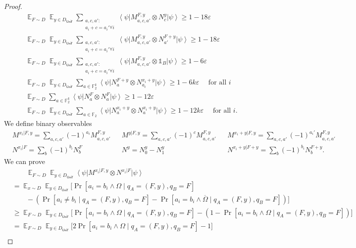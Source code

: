 \documentclass[10pt,a4paper]{article}
\theoremstyle{plain}
\theoremstyle{definition}
\newcommand {\bra} [1] {\ensuremath{ \left\langle #1 \right| }}
\newcommand {\ket} [1] {\ensuremath{ \left| #1 \right\rangle }}
\DeclareMathOperator*{\bigE}{\mathbb{E}}
\newcommand {\id} {\ensuremath{\mathds{1}}}
\newcommand{\ep} {\ensuremath{\varepsilon}}
\newcommand{\x}{\otimes}
\newcommand{\1}{\mathbb{1}} %
\newcommand{\bF}{\mathbb{F}}
\newcommand{\Unif}{\mathsf{Unif}}
\begin{document}
\begin{proof}
\begin{align*}
	&\bigE_{F \sim D} \bigE_{y \in D_{\Unif}}  \sum_{\substack{a,c,a': \\ a_i + c = a_i' \forall i}} \bra{\psi} M^{F,y}_{a, c, a'} \x N^y_c \ket{\psi }\geq 1 - 18 \ep \\
	&\bigE_{F \sim D} \bigE_{y \in D_{\Unif}} \sum_{\substack{a,c,a': \\ a_i + c = a_i' \forall i}}\bra{\psi} M^{F,y}_{a, c, a'} \x N^{F+y}_{a'} \ket{\psi }  \geq 1 - 18 \ep \\
	&\bigE_{F \sim D} \bigE_{y \in D_{\Unif}} \sum_{\substack{a,c,a': \\ a_i + c = a_i' \forall i}} \bra{\psi} M^{F,y}_{a, c, a'} \x \id_B \ket{\psi } \geq 1 - 6\ep \\
	&\bigE_{F \sim D} \bigE_{y \in D_{\Unif}} \sum_{a \in \bF_2^k} \bra{\psi} N^{F+y}_a \x N^{x_i + y}_{a_i} \ket{\psi} \geq 1 - 6k \ep \quad\text{ for all } i\\
	&\bigE_{F \sim D} \sum_{a \in \bF_2^k} \bra{\psi} N^F_a \x N^F_a \ket{\psi} \geq 1 - 12\ep \\
	&\bigE_{F \sim D} \bigE_{y \in D_{\Unif}} \sum_{a \in \bF_2} \bra{\psi} N^{x_i+y}_a \x N^{x_i+y}_a \ket{\psi} \geq 1 - 12k\ep \quad\text{ for all } i.
\end{align*}
We define binary observables 
\begin{align*}
	&M^{x_i|F,y} = \sum_{a, c, a'} (-1)^{a_i} M^{F,y}_{a,c,a'} &&
	M^{y|F,y} = \sum_{a, c, a'} (-1)^{c} M^{F,y}_{a,c,a'} &&
	M^{x_i + y | F, y} = \sum_{a,c,a'} (-1)^{a_i'} M^{F,y}_{a,c,a'} \\
	&N^{x_i | F } = \sum_{b} (-1)^{b_i} N^F_b && 
	N^y = N^y_0 - N^y_1 &&
	N^{x_i+y | F+y} = \sum_{b} (-1)^{b_i} N^{F+y}_b.
\end{align*}
We can prove
\begin{align*}
	&\quad \quad \bigE_{F \sim D} \bigE_{y \in D_{\Unif}} \bra{\psi} M^{x_i| F, y} \x N^{x_i | F} \ket{\psi} \\
	& =\bigE_{x \sim D} \bigE_{y \in D_{\Unif}} \Big[ \Pr[a_i = b_i \land \Omega \mid q_A = (F,y), q_B = F] \\
	&\quad\quad- (\Pr[ a_i \neq b_i \mid q_A = (F,y),  q_B = F] - \Pr[ a_i = b_i \land \overline{\Omega} \mid q_A= (F,y), q_B= F]) \Big]\\
	& \geq \bigE_{F \sim D} \bigE_{y \in D_{\Unif}} \Big[\Pr[a_i = b_i \land \Omega \mid q_A = (F,y), q_B = F] - ( 1 - \Pr[a_i = b_i \land \Omega \mid q_A =(F,y), q_B = F]) \Big]\\
	& =\bigE_{F \sim D} \bigE_{y \in D_{\Unif}} \Big[ 2 \Pr[a_i = b_i \land \Omega \mid q_A = (F,y), q_B = F] - 1\Big] \\

\end{align*}
\end{proof}
\end{document}
